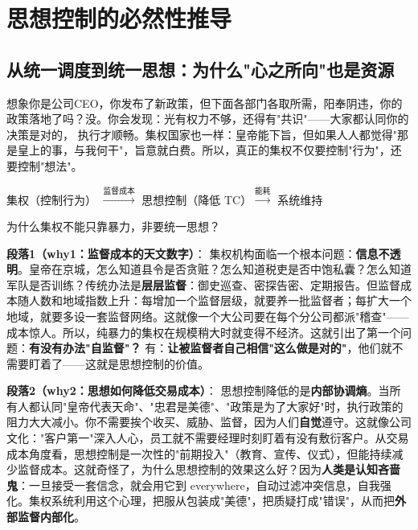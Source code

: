 \documentclass[../main.tex]{subfiles}
\begin{document}
	\section{思想控制的必然性推导}
	
	\subsection{从统一调度到统一思想：为什么"心之所向"也是资源}
	
	\begin{motivation}
				想象你是公司CEO，你发布了新政策，但下面各部门各取所需，阳奉阴违，你的政策落地了吗？没。你会发现：光有权力不够，还得有"共识"——大家都认同你的决策是对的，
		执行才顺畅。集权国家也一样：皇帝能下旨，但如果人人都觉得"那是皇上的事，与我何干"，旨意就白费。所以，真正的集权不仅要控制"行为"，还要控制"想法"。
	\end{motivation}
	
	\begin{logicmap}
		集权（控制行为） $\xrightarrow{\text{监督成本}}$ 思想控制（降低 TC）$\xrightarrow{\text{能耗}}$ 系统维持
	\end{logicmap}
	
	\begin{questionbox}
		为什么集权不能只靠暴力，非要统一思想？
	\end{questionbox}
	
	\textbf{段落1（why1：监督成本的天文数字）}：  
	集权机构面临一个根本问题：\textbf{信息不透明}。皇帝在京城，怎么知道县令是否贪赃？怎么知道税吏是否中饱私囊？怎么知道军队是否训练？传统办法是\textbf{层层监督}：御史巡查、密探告密、定期报告。但监督成本随人数和地域指数上升：每增加一个监督层级，就要养一批监督者；每扩大一个地域，就要多设一套监督网络。这就像一个大公司要在每个分公司都派"稽查"——成本惊人。所以，纯暴力的集权在规模稍大时就变得不经济。这就引出了第一个问题：\textbf{有没有办法"自监督"？} 有：\textbf{让被监督者自己相信"这么做是对的"}，他们就不需要盯着了——这就是思想控制的价值。
	
	\textbf{段落2（why2：思想如何降低交易成本）}：  
	思想控制降低的是\textbf{内部协调熵}。当所有人都认同"皇帝代表天命"、"忠君是美德"、"政策是为了大家好"时，执行政策的阻力大大减小。你不需要挨个收买、威胁、监督，因为人们\textbf{自觉}遵守。这就像公司文化："客户第一"深入人心，员工就不需要经理时刻盯着有没有敷衍客户。从交易成本角度看，思想控制是一次性的"前期投入"（教育、宣传、仪式），但能持续减少监督成本。这就奇怪了，为什么思想控制的效果这么好？因为\textbf{人类是认知吝啬鬼}：一旦接受一套信念，就会用它到 everywhere，自动过滤冲突信息，自我强化。集权系统利用这个心理，把服从包装成"美德"，把质疑打成"错误"，从而把\textbf{外部监督内部化}。
	
\end{document}

